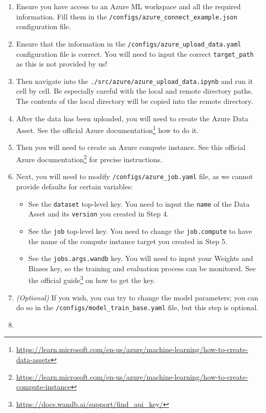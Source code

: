 \begin{enumerate}
\item Ensure you have access to an Azure ML workspace and all the required
  information. Fill them in the
  \texttt{/configs/azure\_connect\_example.json} configuration file.
\item Ensure that the information in the
  \texttt{/configs/azure\_upload\_data.yaml} configuration file is
  correct. You will need to input the correct
  \texttt{target\_path} as this is not provided by us!
\item Then navigate into the \texttt{./src/azure/azure\_upload\_data.ipynb}
  and run it cell by cell. Be especially careful with the local and
  remote directory paths. The contents of the local directory will be
  copied into the remote directory.
\item After the data has been uploaded, you will need to create the Azure
  Data Asset. See the official Azure documentation\footnote{\url{https://learn.microsoft.com/en-us/azure/machine-learning/how-to-create-data-assets}} how to do it.
\item Then you will need to create an Azure compute instance. See this official Azure documentation\footnote{\url{https://learn.microsoft.com/en-us/azure/machine-learning/how-to-create-compute-instance}} for precise instructions.
\item Next, you will need to modify \texttt{/configs/azure\_job.yaml} file,
  as we cannot provide defaults for certain variables:
  \begin{itemize}
  \item
    See the \texttt{dataset} top-level key. You need to input the
    \texttt{name} of the Data Asset and its \texttt{version} you created
    in Step 4.
  \item
    See the \texttt{job} top-level key. You need to change the
    \texttt{job.compute} to have the name of the compute instance target
    you created in Step 5.
  \item
    See the \texttt{jobs.args.wandb} key. You will need to input your
    Weights and Biases key, so the training and evaluation process can
    be monitored. See the official guide\footnote{\url{https://docs.wandb.ai/support/find_api_key/}} on how to get the key.
  \end{itemize}
\item
  \emph{(Optional)} If you wish, you can try to change the model
  parameters; you can do so in the
  \texttt{/configs/model\_train\_base.yaml} file, but this step is
  optional.
\item

\end{enumerate}
